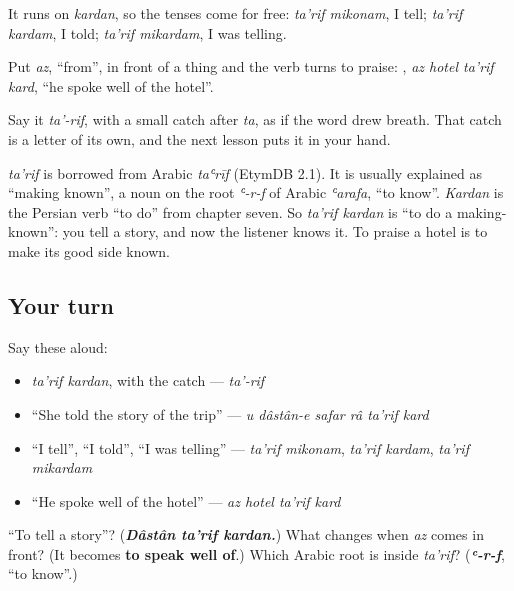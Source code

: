 It runs on \emph{kardan}, so the tenses come for free: \emph{ta'rif mikonam}, I tell; \emph{ta'rif kardam}, I told; \emph{ta'rif mikardam}, I was telling.

Put \emph{az}, \textquotedblleft{}from\textquotedblright{}, in front of a thing and the verb turns to praise: \textbf{   }, \emph{az hotel ta'rif kard}, \textquotedblleft{}he spoke well of the hotel\textquotedblright{}.

Say it \emph{ta'-rif}, with a small catch after \emph{ta}, as if the word drew breath. That catch is a letter of its own, and the next lesson puts it in your hand.

\begin{cousinweb}
\emph{ta'rif} is borrowed from Arabic \emph{taʿrīf} (EtymDB 2.1). It is usually explained as \textquotedblleft{}making known\textquotedblright{}, a noun on the root \emph{ʿ-r-f} of Arabic \emph{ʿarafa}, \textquotedblleft{}to know\textquotedblright{}. \emph{Kardan} is the Persian verb \textquotedblleft{}to do\textquotedblright{} from chapter seven. So \emph{ta'rif kardan} is \textquotedblleft{}to do a making-known\textquotedblright{}: you tell a story, and now the listener knows it. To praise a hotel is to make its good side known.
\end{cousinweb}

\subsection*{Your turn}
Say these aloud:

\begin{itemize}
\raggedright
  \item \emph{ta'rif kardan}, with the catch — \emph{ta'-rif}
  \item \textquotedblleft{}She told the story of the trip\textquotedblright{} — \emph{u dâstân-e safar râ ta'rif kard}
  \item \textquotedblleft{}I tell\textquotedblright{}, \textquotedblleft{}I told\textquotedblright{}, \textquotedblleft{}I was telling\textquotedblright{} — \emph{ta'rif mikonam}, \emph{ta'rif kardam}, \emph{ta'rif mikardam}
  \item \textquotedblleft{}He spoke well of the hotel\textquotedblright{} — \emph{az hotel ta'rif kard}
\end{itemize}

\begin{tcolorbox}[breakable,colback=teal!4,colframe=teal!35!black,title={Before you move on}]
\textquotedblleft{}To tell a story\textquotedblright{}? (\emph{\textbf{Dâstân ta'rif kardan.}}) What changes when \emph{az} comes in front? (It becomes \textbf{to speak well of}.) Which Arabic root is inside \emph{ta'rif}? (\emph{\textbf{ʿ-r-f}}, \textquotedblleft{}to know\textquotedblright{}.)
\end{tcolorbox}
